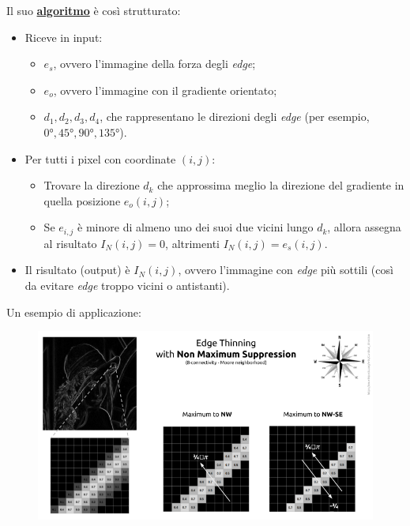 \documentclass[a4paper]{article}
\begin{document}
	\noindent
	Il suo \textbf{\underline{algoritmo}} è così strutturato:
	\begin{itemize}
		\item Riceve in input:
		\begin{itemize}
			\item $e_{s}$, ovvero l'immagine della forza degli \emph{edge};
			\item $e_{o}$, ovvero l'immagine con il gradiente orientato;
			\item $d_{1}, d_{2}, d_{3}, d_{4}$, che rappresentano le direzioni degli \emph{edge} (per esempio, $0°, 45°, 90°, 135°$).
		\end{itemize}
		
		\item Per tutti i pixel con coordinate $\left(i,j\right)$:
		\begin{itemize}
			\item Trovare la direzione $d_{k}$ che approssima meglio la direzione del gradiente in quella posizione $e_{o}\left(i,j\right)$;

			\item Se $e_{i,j}$ è minore di almeno uno dei suoi due vicini lungo $d_{k}$, allora assegna al risultato $I_{N}\left(i,j\right) = 0$, altrimenti $I_{N}\left(i,j\right) = e_{s}\left(i,j\right)$.
		\end{itemize}
		
		\item Il risultato (output) è $I_{N}\left(i,j\right)$, ovvero l'immagine con \emph{edge} più sottili (così da evitare \emph{edge} troppo vicini o antistanti).
	\end{itemize}
	Un esempio di applicazione:
	\begin{figure}[!htp]
		\centering
		\includegraphics[width=1\textwidth]{img/Non-Maxima_Suppression.png}
	\end{figure}
	
\end{document}

